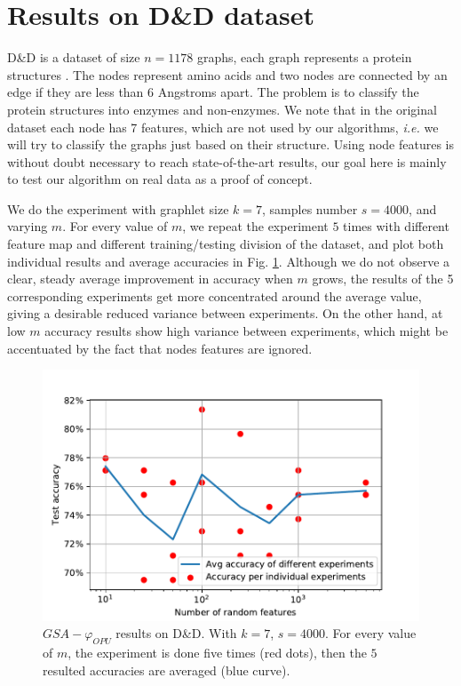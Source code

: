 \section{Results on D\&D dataset}
D\&D is a dataset of size $n=1178$ graphs, each graph represents a protein structures \citep{DD_ref}. The nodes represent amino acids and two nodes are connected by an edge if they are less than 6 Angstroms apart. The problem  is to classify the protein structures into enzymes and non-enzymes. We note that in the original dataset each node has 7 features, which are not used by our algorithms, \emph{i.e.} we will try to classify the graphs just based on their structure. Using node features is without doubt necessary to reach state-of-the-art results, our goal here is mainly to test our algorithm on real data as a proof of concept.

We do the experiment with graphlet size $k=7$, samples number $s=4000$, and varying $m$.
For every value of $m$, we repeat the experiment $5$ times with different feature map and different training/testing division of the dataset, and plot both individual results and average accuracies in Fig. \ref{fig:DD}. %
Although we do not observe a clear, steady average improvement in accuracy when $m$ grows, the results of the 5 corresponding experiments get more concentrated around the average value, giving a desirable reduced variance between experiments. On the other hand, at low $m$ accuracy results show high variance between experiments, which might be accentuated by the fact that nodes features are ignored. %

\begin{figure}[H]
\centering
\includegraphics[scale=0.6]{figs/DD.pdf}
\caption[$GSA-\varphi_{OPU}$ results on D\&D dataset]{$GSA-\varphi_{OPU}$ results on D\&D. With  $k=7$, $s=4000$. For every value of $m$, the experiment is done five times (red dots), then the $5$ resulted accuracies are averaged (blue curve).}
\label{fig:DD}
\end{figure}



